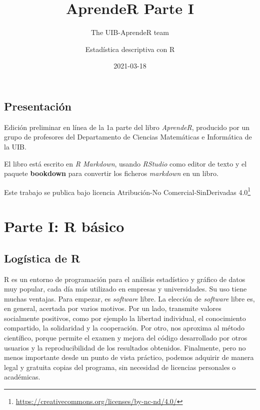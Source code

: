 \documentclass[
]{book}
\title{AprendeR Parte I}
\subtitle{The UIB-AprendeR team}
\author{Estadística descriptiva con R}
\date{2021-03-18}
\DeclareRobustCommand{\href}[2]{#2\footnote{\url{#1}}}
\theoremstyle{definition}
\theoremstyle{definition}
\theoremstyle{definition}
\theoremstyle{remark}
\begin{document}
\maketitle


\makeatletter
{}
{
\hypersetup{linkcolor=blue}
\setcounter{tocdepth}{1}
\tableofcontents
}
\renewcommand{\leq}{\leqslant}
\renewcommand{\geq}{\geqslant}

\hypertarget{presentaciuxf3n}{%
\chapter*{Presentación}\label{presentaciuxf3n}}

Edición preliminar en línea de la 1a parte del libro \emph{AprendeR}, producido por un grupo de profesores del Departamento de Ciencias Matemáticas e Informática de la UIB.

El libro está escrito en \emph{R Markdown}, usando \emph{RStudio} como editor de texto y el paquete \textbf{bookdown} para convertir los ficheros \emph{markdown} en un libro.

Este trabajo se publica bajo licencia \href{https://creativecommons.org/licenses/by-nc-nd/4.0/}{Atribución-No Comercial-SinDerivadas 4.0}

\hypertarget{part-parte-i-r-buxe1sico}{%
\part*{Parte I: R básico}\label{part-parte-i-r-buxe1sico}}

\hypertarget{chap:0}{%
\chapter{Logística de R}\label{chap:0}}

R es un entorno de programación para el análisis estadístico y gráfico de datos muy popular, cada día más utilizado en empresas y universidades. Su uso tiene muchas ventajas. Para empezar, es \emph{software} libre. La elección de \emph{software} libre es, en general, acertada por varios motivos. Por un lado, transmite valores socialmente positivos, como por ejemplo la libertad individual, el conocimiento compartido, la solidaridad y la cooperación. Por otro, nos aproxima al método científico, porque permite el examen y mejora del código desarrollado por otros usuarios y la reproducibilidad de los resultados obtenidos. Finalmente, pero no menos importante desde un punto de vista práctico, podemos adquirir de manera legal y gratuita copias del programa, sin necesidad de licencias personales o académicas.
\end{document}

